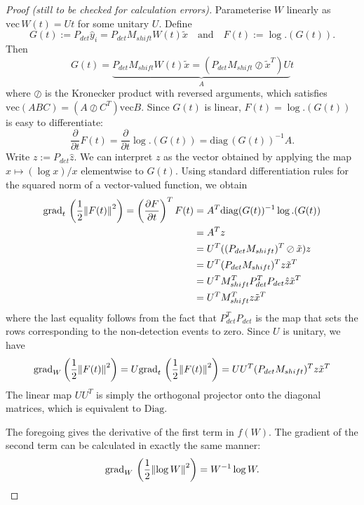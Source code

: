 \documentclass{article}
\begin{document}
\begin{proof}[Proof (still to be checked for calculation errors)]

Parameterise $W$ linearly as $\mathrm{vec}\, W(t) = U t$ for some unitary $U$.
Define $$
G(t) :=
P_{det} \hat{y}_i
=
P_{det} M_{shift} W(t) \tilde{x}
\quad\text{and}\quad
F(t) := \log.(G(t))
.$$
Then 
$$
G(t) = \underbrace{P_{det} M_{shift} W(t) \tilde{x} = (P_{det}M_{shift} \oslash \tilde{x}^T) U}_A t
$$
where $\oslash$ is the Kronecker product with reversed arguments, which satisfies $\mathrm{vec}(A B C) = (A \oslash C^T) \mathrm{vec} B$.
Since $G(t)$ is linear, $F(t) = \log.(G(t))$ is easy to differentiate:
$$
\frac{\partial}{\partial t} F(t) =
\frac{\partial}{\partial t} \log.(G(t)) = \mathrm{diag}\,(G(t))^{-1} A
.$$
Write $z := P_{det} \hat{z}$.
We can interpret $z$ as the vector obtained by applying the map $x \mapsto (\log x) / x$ elementwise to $G(t)$.
Using standard differentiation rules for the squared norm of a vector-valued function, we obtain
\begin{align*}
\mathrm{grad}_t\, \left(\frac{1}{2} \norm{F(t)}^2 \right) = \left(\frac{\partial F}{\partial t}\right)^T F(t)
&= A^T \mathrm{diag}(G(t))^{-1} \log.(G(t)) \\
&= A^T z \\
&= U^T ((P_{det} M_{shift})^T \oslash \tilde{x}) z \\
&= U^T (P_{det} M_{shift})^T z \tilde{x}^T \\
&= U^T M_{shift}^T P_{det}^T P_{det} \hat{z} \tilde{x}^T \\
&= U^T M_{shift}^T z \tilde{x}^T
\end{align*}
where the last equality follows from the fact that $P_{det}^T P_{det}$ is the map that sets the rows corresponding to the non-detection events to zero. 
Since $U$ is unitary, we have $$
\mathrm{grad}_W \left(\frac{1}{2} \norm{F(t)}^2 \right)
=
U \mathrm{grad}_t\, \left(\frac{1}{2} \norm{F(t)}^2 \right)
=
UU^T (P_{det} M_{shift})^T z \tilde{x}^T
$$
The linear map $UU^T$ is simply the orthogonal projector onto the diagonal matrices, which is equivalent to $\mathrm{Diag}$.

The foregoing gives the derivative of the first term in $f(W)$. The gradient of the second term can be calculated in exactly the same manner: 
$$
\mathrm{grad}_W\, \left(\frac{1}{2}\norm{\log W}^2\right) = W^{-1} \log W
.$$
\end{proof}


\printbibliography
\end{document}
